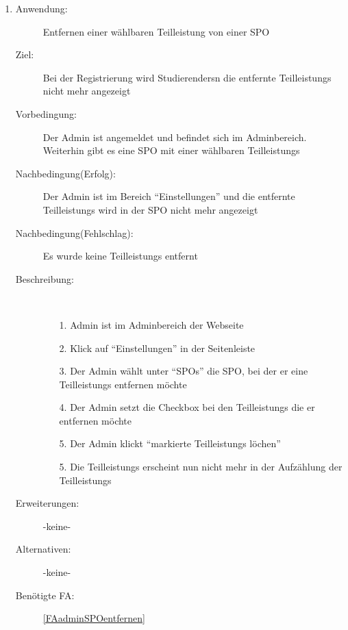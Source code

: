 \documentclass[parskip=full]{scrartcl}
\newcommand{\swtLabel}[1]{\textbf{/#1\arabic*0/}}
\begin{document}
\begin{enumerate} [label=\swtLabel{A}]
  \item \label{UCadminSPOteilleistungRM}
    \begin{description}
    \item[Anwendung:] Entfernen einer wählbaren \gls{Teilleistung} von einer
    \gls{SPO}
    \item[Ziel:] Bei der Registrierung wird \glspl{Studierender}n die entfernte
    \glspl{Teilleistung} nicht mehr angezeigt
    \item[Vorbedingung:] Der \gls{Admin} ist angemeldet und befindet sich im
    \gls{Admin}bereich. Weiterhin gibt es eine \gls{SPO} mit einer wählbaren
    \glspl{Teilleistung}
    \item[Nachbedingung(Erfolg):] Der \gls{Admin} ist im Bereich
    \enquote{Einstellungen} und die entfernte \glspl{Teilleistung} wird in der \gls{SPO}
    nicht mehr angezeigt
    \item[Nachbedingung(Fehlschlag):] Es wurde keine \glspl{Teilleistung} entfernt
    \item[Beschreibung:]~
    \begin{enumerate}
      \item[1.] \gls{Admin} ist im \gls{Admin}bereich der Webseite
      \item[2.] Klick auf \enquote{Einstellungen} in der Seitenleiste
       \item[3.] Der \gls{Admin} wählt unter \enquote{\glspl{SPO}} die \gls{SPO}, bei der er
       eine \glspl{Teilleistung} entfernen möchte
      \item[4.] Der \gls{Admin} setzt die Checkbox bei den \glspl{Teilleistung} die er
      entfernen möchte
      \item[5.] Der \gls{Admin} klickt \enquote{markierte \glspl{Teilleistung}
      löchen}
      \item[5.] Die \glspl{Teilleistung} erscheint nun nicht mehr in der Aufzählung der
      \glspl{Teilleistung} 
    \end{enumerate}
    \item[Erweiterungen:] -keine-
    \item[Alternativen:] -keine-
    \item[Benötigte FA:] \ref{FAadminSPOentfernen}
  \end{description}
  

\end{enumerate}
\end{document}
